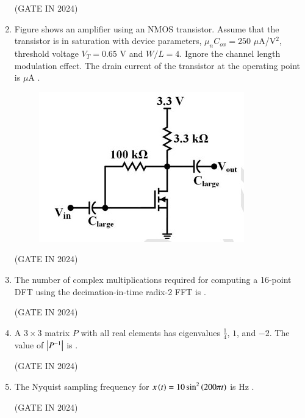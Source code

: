 \documentclass[journal,12pt,onecolumn]{IEEEtran}
\theoremstyle{remark}
\begin{document}
\begin{enumerate}
    \hfill{(GATE IN 2024)}

    \item Figure shows an amplifier using an NMOS transistor. Assume that the transistor is in saturation with device parameters, $\mu_n C_{ox} = 250$ $\mu$A/V$^2$, threshold voltage $V_T = 0.65$ V and $W/L=4$. Ignore the channel length modulation effect. The drain current of the transistor at the operating point is \underline{\hspace{2cm}} $\mu$A .
    \begin{figure}[H]
        \centering
        \includegraphics[width=0.6\columnwidth]{figs/p12.jpg}
        \caption*{}
        \label{fig:p12}
    \end{figure}
    
    \hfill{(GATE IN 2024)}

    \item The number of complex multiplications required for computing a 16-point DFT using the decimation-in-time radix-2 FFT is \underline{\hspace{2cm}} .
    
    \hfill{(GATE IN 2024)}

    \item A $3 \times 3$ matrix $P$ with all real elements has eigenvalues $\frac{1}{4}$, $1$, and $-2$. The value of $\left\vert P^{-1}\right\vert$ is \underline{\hspace{2cm}} .
    
    \hfill{(GATE IN 2024)}

    \item The Nyquist sampling frequency for $x\left(t\right) = 10 \sin^2\left(200\pi t\right)$ is \underline{\hspace{2cm}} Hz .
    
    \hfill{(GATE IN 2024)}
    

\end{enumerate}
\end{document}
